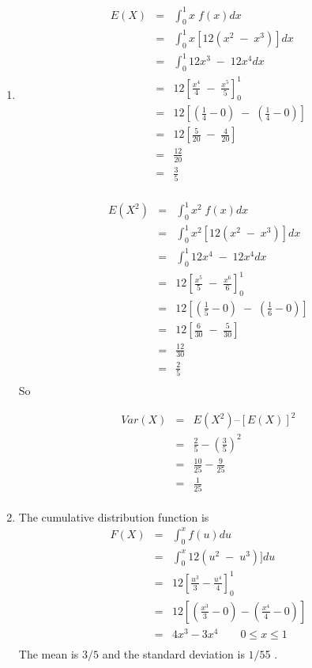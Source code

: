 \documentclass[a4paper,12pt]{article}
\begin{document}
\begin{enumerate}
\item  
\begin{eqnarray*}
E(X) &=& \int^{1}_{0} x \;f(x) dx \\
&=& \int^{1}_{0} x[12(x^2\;-\;x^3)] dx \\
&=& \int^{1}_{0} 12x^3\;-\;12x^4 dx \\
&=& 12 \left[ \frac{x^4}{4} \;-\; \frac{x^5}{5}\right]^1_0\\
&=& 12 \left[ \left( \frac{1}{4}- 0 \right) \;-\; \left( \frac{1}{4}- 0 \right)  \right]\\
&=& 12 \left[  \frac{5}{20} \;-\; \frac{4}{20} \right]\\
&=&  \frac{12}{20} \\
&=&  \frac{3}{5}\\
\end{eqnarray*}


\begin{eqnarray*}
E(X^2) &=& \int^{1}_{0} x^2 \;f(x) dx \\
&=& \int^{1}_{0} x^2[12(x^2\;-\;x^3)] dx \\
&=& \int^{1}_{0} 12x^4\;-\;12x^4 dx \\
&=& 12 \left[ \frac{x^5}{5} \;-\; \frac{x^6}{6}\right]^1_0\\
&=& 12 \left[ \left( \frac{1}{5}- 0 \right) \;-\; \left( \frac{1}{6}- 0 \right)  \right]\\
&=& 12 \left[  \frac{6}{30} \;-\; \frac{5}{30} \right]\\
&=&  \frac{12}{30} \\
&=&  \frac{2}{5}\\
\end{eqnarray*}
So 

\begin{eqnarray*}
Var(X) &=& E(X^2) – [E(X)]^2 \\
 &=& \frac{2}{5} - \left(\frac{3}{5}\right)^2 \\
 &=& \frac{10}{25} - \frac{9}{25} \\
 &=& \frac{1}{25} \\
\end{eqnarray*}

\item  The cumulative distribution function is
\begin{eqnarray*}
F(X) &=& \int^{x}_{0} f(u) du \\
&=& \int^{x}_{0} 12(u^2\;-\;u^3)] du \\
&=& 12 \left[ \frac{u^3}{3} - \frac{u^4}{4}\right]^1_0\\
&=& 12 \left[ \left( \frac{x^3}{3}- 0 \right) - \left( \frac{x^4}{4}- 0 \right)  \right]\\
&=&  4x^3- 3x^4  \qquad 0 \leq x \leq 1 \\
\end{eqnarray*}
The mean is $3/5$
and the standard deviation is $1/5$5 . 


\end{enumerate}
\end{document}
